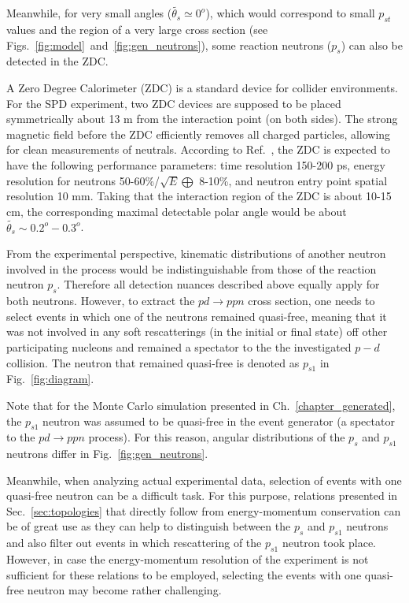 Meanwhile, for very small angles ($\widetilde{\theta_{s}}\simeq 0^{o}$), which would correspond to small $p_{st}$ values and the region of a very large cross section (see Figs.~\ref{fig:model}~and~\ref{fig:gen_neutrons}), some reaction neutrons ($p_{s}$) can also be detected in the ZDC. %

  
    
A Zero Degree Calorimeter (ZDC) is a standard device for collider environments. For the SPD experiment, two ZDC devices are supposed to be placed symmetrically about 13 m from the interaction point (on both sides). The strong magnetic field before the ZDC efficiently removes all charged particles, allowing for clean measurements of neutrals. According to Ref.~\cite{TDR_SPD}, the ZDC is expected to have the following performance parameters: time resolution 150-200 ps, energy resolution for neutrons 50-60\%/$\sqrt{E} \bigoplus$ 8-10\%, and neutron entry point spatial resolution 10 mm. Taking that the interaction region of the ZDC is about 10-15 cm, the corresponding maximal detectable polar angle would be about $\widetilde{\theta_{s}}\sim 0.2^{o}-0.3^{o}$.    

From the experimental perspective, kinematic distributions of another neutron involved in the process would be indistinguishable from those of the reaction neutron $p_{s}$. Therefore all detection nuances described above equally apply for both neutrons. However, to extract the $pd\rightarrow ppn$ cross section, one needs to select events in which one of the neutrons remained quasi-free, meaning that it was not involved in any soft rescatterings (in the initial or final state) off other participating nucleons and remained a spectator to the the investigated $p-d$ collision. The neutron that remained quasi-free is denoted as $p_{s1}$ in Fig.~\ref{fig:diagram}. 


Note that for the Monte Carlo simulation presented in Ch.~\ref{chapter_generated}, the $p_{s1}$ neutron was assumed to be quasi-free in the event generator (a spectator to the $pd\rightarrow ppn$ process). For this reason, angular distributions of the $p_{s}$ and $p_{s1}$ neutrons differ in Fig.~\ref{fig:gen_neutrons}.

Meanwhile, when analyzing actual experimental data, selection of events with one quasi-free neutron can be a difficult task. For this purpose, relations presented in Sec.~\ref{sec:topologies} that directly follow from energy-momentum conservation can be of great use as they can help to distinguish between the $p_{s}$ and $p_{s1}$ neutrons and also filter out events in which rescattering of the $p_{s1}$ neutron took place. However, in case the energy-momentum resolution of the experiment is not sufficient for these relations to be employed, selecting the events with one quasi-free neutron may become rather challenging. %



